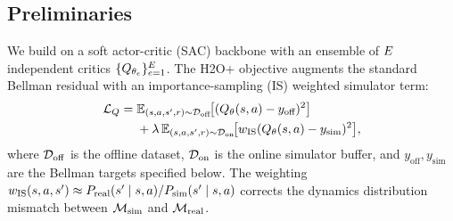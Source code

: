 \subsection{Preliminaries}
\label{sec:method:prelim}

We build on a soft actor-critic (SAC) \citep{haarnoja2018soft} backbone with an ensemble of $E$ independent critics $\{Q_{\theta_e}\}_{e=1}^{E}$.
The H2O+ objective augments the standard Bellman residual with an importance-sampling (IS) weighted simulator term:
\begin{equation}
\begin{aligned}
\mathcal{L}_{Q} = \;& \mathbb{E}_{(s,a,s',r) \sim \mathcal{D}_{\mathrm{off}}}\!\bigl[ (Q_\theta(s,a) - y_{\text{off}})^2 \bigr] \\
 & + \lambda \,\mathbb{E}_{(s,a,s',r) \sim \mathcal{D}_{\mathrm{on}}}\!\bigl[ w_{\mathrm{IS}}(Q_\theta(s,a) - y_{\text{sim}})^2 \bigr],
\end{aligned}
\label{eq:hybrid_bellman}
\end{equation}
where $\mathcal{D}_{\mathrm{off}}$ is the offline dataset, $\mathcal{D}_{\mathrm{on}}$ is the online simulator buffer, and $y_{\text{off}}, y_{\text{sim}}$ are the Bellman targets specified below.
The weighting $w_{\mathrm{IS}}(s,a,s') \approx P_{\mathrm{real}}(s'\mid s,a)/P_{\mathrm{sim}}(s'\mid s,a)$ corrects the dynamics distribution mismatch between $\mathcal{M}_{\mathrm{sim}}$ and $\mathcal{M}_{\mathrm{real}}$.

